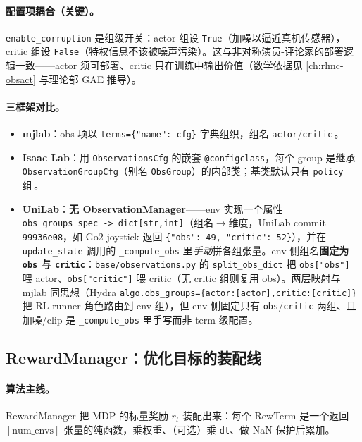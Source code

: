 \paragraph{配置项耦合（关键）。}\verb|enable_corruption| 是组级开关：actor 组设 \verb|True|（加噪以逼近真机传感器），critic 组设 \verb|False|（特权信息不该被噪声污染）。这与非对称演员-评论家的部署逻辑一致——actor 须可部署、critic 只在训练中输出价值（数学依据见 \cref{ch:rlmc-obsact} 与理论部 GAE 推导）。

\paragraph{三框架对比。}
\begin{itemize}
  \item \textbf{mjlab}：obs 项以 \verb|terms={"name": cfg}| 字典组织，组名 \verb|actor|/\verb|critic|\,\cite{mjlab2026}。
  \item \textbf{Isaac Lab}：用 \verb|ObservationsCfg| 的嵌套 \verb|@configclass|，每个 group 是继承 \verb|ObservationGroupCfg|（别名 \verb|ObsGroup|）的内部类；基类默认只有 \verb|policy| 组\,\cite{isaaclab2024}。
  \item \textbf{UniLab}：\textbf{无 ObservationManager}——env 实现一个属性 \verb|obs_groups_spec -> dict[str,int]|（组名$\to$维度，UniLab commit \texttt{99936e08}，如 Go2 joystick 返回 \verb|{"obs": 49, "critic": 52}|），并在 \verb|update_state| 调用的 \verb|_compute_obs| 里\emph{手动}拼各组张量。env 侧组名\textbf{固定为 \texttt{obs} 与 \texttt{critic}}：\verb|base/observations.py| 的 \verb|split_obs_dict| 把 \verb|obs["obs"]| 喂 actor、\verb|obs["critic"]| 喂 critic（无 critic 组则复用 obs）。两层映射与 mjlab 同思想（Hydra \verb|algo.obs_groups={actor:[actor],critic:[critic]}| 把 RL runner 角色路由到 env 组），但 env 侧固定只有 \texttt{obs}/\texttt{critic} 两组、且加噪/clip 是 \verb|_compute_obs| 里手写而非 term 级配置。
\end{itemize}

\subsection{RewardManager：优化目标的装配线}
\label{sec:rlmc-mgr-reward}

\paragraph{算法主线。}RewardManager 把 MDP 的标量奖励 $r_t$ 装配出来：每个 RewTerm 是一个返回 $[\text{num\_envs}]$ 张量的纯函数，乘权重、（可选）乘 \verb|dt|、做 NaN 保护后累加。

